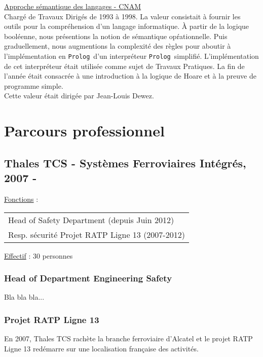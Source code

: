 \documentclass[a4paper,12pt]{article}
\newcommand{\Prolog}{{\tt Prolog}}
\newcommand{\smallspace}{\vspace{0.25cm}}
\begin{document}
\smallspace
\hspace{-0.6cm}\underline{Approche s\'emantique des langages - CNAM}
\\
Charg\'e de Travaux Dirig\'es de 1993 \`a 1998. La valeur consistait \`a
fournir les outils pour la compr\'ehension d'un langage informatique.
\`A partir de la logique bool\'eenne, nous pr\'esentions la notion de
s\'emantique op\'rationnelle. Puis graduellement, nous augmentions la
complexit\'e des r\`egles pour aboutir \`a l'impl\'ementation en
\Prolog\ d'un interpr\'eteur \Prolog\ simplifi\'e. L'impl\'ementation
de cet interpr\'eteur \'etait utilis\'ee comme sujet de Travaux
Pratiques.  La fin de l'ann\'ee \'etait consacr\'ee \`a une
introduction \`a la logique de Hoare et \`a la preuve de programme
simple.
\\
Cette valeur \'etait dirig\'ee par Jean-Louis Dewez.


\newpage
\section{Parcours professionnel}
\subsection{Thales TCS - Syst\`emes Ferroviaires Int\'egr\'es, 2007 - }
\hspace{-0.6cm}\underline{Fonctions} : 
\begin{tabular}{l}
Head of Safety Department (depuis Juin 2012)\\
Resp. s\'ecurit\'e Projet RATP Ligne 13 (2007-2012) \\
\end{tabular}

\hspace{-0.6cm}\underline{Effectif} : 30 personnes
\\
\subsubsection{Head of Department Engineering Safety}
Bla bla bla...

\subsubsection{Projet RATP Ligne 13}
En 2007, Thales TCS rach\`ete la branche ferroviaire d'Alcatel et le
projet RATP Ligne 13 red\'emarre sur une localisation fran\c{c}aise des
activit\'es. 
\end{document}
